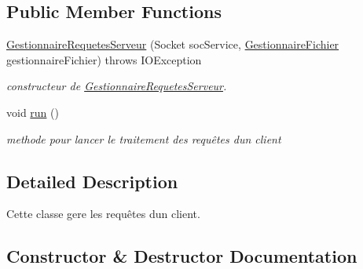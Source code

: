 \subsection*{Public Member Functions}
\begin{DoxyCompactItemize}
\item 
\hyperlink{classcommon_1_1GestionnaireRequetesServeur_af17b749cf30080cec886973a7cc2f2aa}{Gestionnaire\+Requetes\+Serveur} (Socket soc\+Service, \hyperlink{classcommon_1_1GestionnaireFichier}{Gestionnaire\+Fichier} gestionnaire\+Fichier)  throws I\+O\+Exception 
\begin{DoxyCompactList}\small\item\em constructeur de \hyperlink{classcommon_1_1GestionnaireRequetesServeur}{Gestionnaire\+Requetes\+Serveur}. \end{DoxyCompactList}\item 
\mbox{\label{classcommon_1_1GestionnaireRequetesServeur_a24848da2b934c89e632ac3c96df3bf8a}} 
void \hyperlink{classcommon_1_1GestionnaireRequetesServeur_a24848da2b934c89e632ac3c96df3bf8a}{run} ()
\begin{DoxyCompactList}\small\item\em methode pour lancer le traitement des requêtes d\textquotesingle{}un client \end{DoxyCompactList}\end{DoxyCompactItemize}


\subsection{Detailed Description}
Cette classe gere les requêtes d\textquotesingle{}un client. 

\subsection{Constructor \& Destructor Documentation}
\mbox{\label{classcommon_1_1GestionnaireRequetesServeur_af17b749cf30080cec886973a7cc2f2aa}} 
